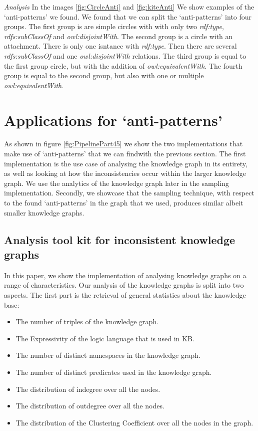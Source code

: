 \documentclass[11pt,letterpaper ,oneside ]{book}
\begin{document}
\textit{Analysis} In the images \ref{fig:CircleAnti} and \ref{fig:kiteAnti} We show examples of the `anti-patterns' we found. We found that we can split the `anti-patterns' into four groups. The first group is are simple circles with with only two \textit{rdf:type}, \textit{rdfs:subClassOf} and \textit{owl:disjointWith}. The second group is a circle with an attachment. There is only one isntance with \textit{rdf:type}. Then there are several \textit{rdfs:subClassOf} and one \textit{owl:disjointWith} relations. The third group is equal to the first group circle, but with the addition of \textit{owl:equivalentWith}. The fourth group is equal to the second group, but also with one or multiple \textit{owl:equivalentWith}. \\

\newpage

\chapter{Applications for `anti-patterns'}\label{Implementation}
As shown in figure \ref{fig:PipelinePart45} we show the two implementations that make use of `anti-patterns' that we can findwith the previous section. The first implementation is the use case of analysing the knowledge graph in its entirety, as well as looking at how the inconsistencies occur within the larger knowledge graph. We use the analytics of the knowledge graph later in the sampling implementation. Secondly, we showcase that the sampling technique, with respect to the found `anti-patterns' in the graph that we used, produces similar albeit smaller knowledge graphs.

\section{Analysis tool kit for inconsistent knowledge graphs}
In this paper, we show the implementation of analysing knowledge graphs on a range of characteristics. Our analysis of the knowledge graphs is split into two aspects. The first part is the retrieval of general statistics about the knowledge base:
\begin{itemize}
	\item The number of triples of the knowledge graph.
	\item The Expressivity of the logic language that is used in KB.
	\item The number of distinct namespaces in the knowledge graph.
	\item The number of distinct predicates used in the knowledge graph.
	\item The distribution of indegree over all the nodes.
	\item The distribution of outdegree over all the nodes.
	\item The distribution of the Clustering Coefficient over all the nodes in the graph.
\end{itemize}
\end{document}
